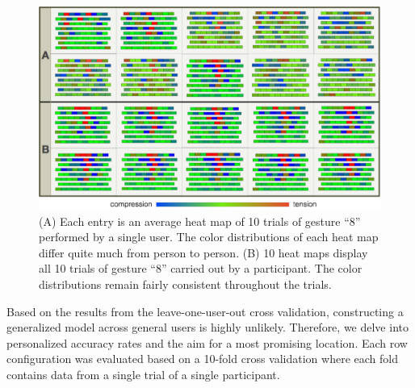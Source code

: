 \documentclass{sigchi}
\begin{document}
\begin{figure}[t]
 \begin{center}
  \includegraphics[width=1\columnwidth]{figures/SVisualNew_v3.pdf}
  \caption{
    (A) Each entry is an average heat map of 10 trials of gesture ``8'' performed by a single user. The color distributions of each heat map differ quite much from person to person.
    (B) 10 heat maps display all 10 trials of gesture ``8'' carried out by a participant. The color distributions remain fairly consistent throughout the trials.
  }
  \label{fig:SVisualNew}
  \end{center}
\end{figure}

Based on the results from the leave-one-user-out cross validation, constructing a generalized model across general users is highly unlikely. Therefore, we delve into personalized accuracy rates and the aim for a most promising location.
Each row configuration was evaluated based on a 10-fold cross validation where each fold contains data from a single trial of a single participant.
\end{document}
